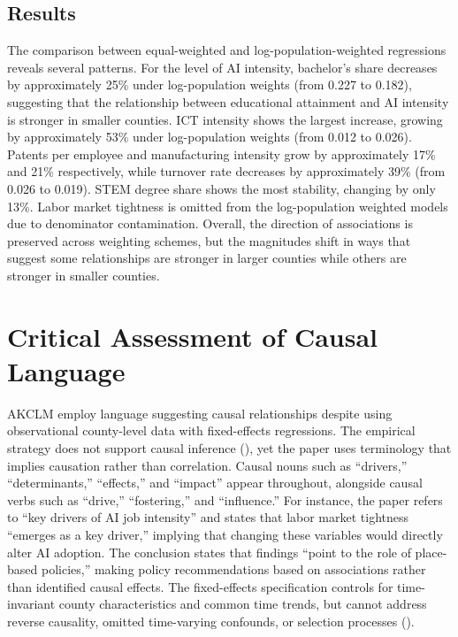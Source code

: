 \documentclass[
]{article}
\begin{document}
\subsection{Results}\label{results}

The comparison between equal-weighted and log-population-weighted
regressions reveals several patterns. For the level of AI intensity,
bachelor's share decreases by approximately 25\% under log-population
weights (from 0.227 to 0.182), suggesting that the relationship between
educational attainment and AI intensity is stronger in smaller counties.
ICT intensity shows the largest increase, growing by approximately 53\%
under log-population weights (from 0.012 to 0.026). Patents per employee
and manufacturing intensity grow by approximately 17\% and 21\%
respectively, while turnover rate decreases by approximately 39\% (from
0.026 to 0.019). STEM degree share shows the most stability, changing by
only 13\%. Labor market tightness is omitted from the log-population
weighted models due to denominator contamination. Overall, the direction
of associations is preserved across weighting schemes, but the
magnitudes shift in ways that suggest some relationships are stronger in
larger counties while others are stronger in smaller counties.

\section{Critical Assessment of Causal
Language}\label{critical-assessment-of-causal-language}

AKCLM employ language suggesting causal relationships despite using
observational county-level data with fixed-effects regressions. The
empirical strategy does not support causal inference
(), yet the paper uses
terminology that implies causation rather than correlation. Causal nouns
such as ``drivers,'' ``determinants,'' ``effects,'' and ``impact''
appear throughout, alongside causal verbs such as ``drive,''
``fostering,'' and ``influence.'' For instance, the paper refers to
``key drivers of AI job intensity'' and states that labor market
tightness ``emerges as a key driver,'' implying that changing these
variables would directly alter AI adoption. The conclusion states that
findings ``point to the role of place-based policies,'' making policy
recommendations based on associations rather than identified causal
effects. The fixed-effects specification controls for time-invariant
county characteristics and common time trends, but cannot address
reverse causality, omitted time-varying confounds, or selection
processes ().
\end{document}
